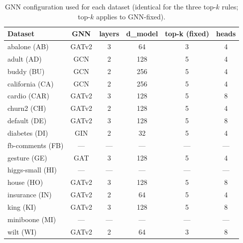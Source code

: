 \begin{table}[t]
\centering
\caption{GNN configuration used for each dataset (identical for the three top-$k$ rules; top-$k$ applies to GNN-fixed).}
\label{tab:gnn_configs}
{%
\begin{tabular}{lccccc}
\toprule
Dataset & GNN & layers & d\_model & top-k (fixed) & heads \\
\midrule
abalone (AB) & GATv2 & 3 & 64 & 3 & 4 \\
adult (AD) & GCN & 2 & 128 & 5 & 4 \\
buddy (BU) & GCN & 2 & 256 & 5 & 4 \\
california (CA) & GCN & 2 & 256 & 5 & 4 \\
cardio (CAR) & GATv2 & 3 & 128 & 5 & 8 \\
churn2 (CH) & GATv2 & 2 & 128 & 5 & 4 \\
default (DE) & GATv2 & 3 & 128 & 5 & 8 \\
diabetes (DI) & GIN & 2 & 32 & 5 & 4 \\
fb-comments (FB) & --- & --- & --- & --- & --- \\
gesture (GE) & GAT & 3 & 128 & 5 & 4 \\
higgs-small (HI) & --- & --- & --- & --- & --- \\
house (HO) & GATv2 & 3 & 128 & 5 & 8 \\
insurance (IN) & GATv2 & 2 & 64 & 5 & 4 \\
king (KI) & GATv2 & 3 & 128 & 5 & 8 \\
miniboone (MI) & --- & --- & --- & --- & --- \\
wilt (WI) & GATv2 & 2 & 64 & 3 & 8 \\
\bottomrule
\end{tabular}}
\end{table}
